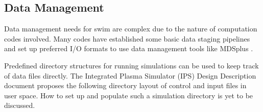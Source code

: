 
\subsection{Data Management}
\label{sec:datamanager}

Data management needs for \ac{swim} are complex due to the nature of
computation codes involved. Many codes have established some basic 
data staging pipelines and set up preferred I/O formats
to use data management tools like MDSplus \cite{mdsplus}. 

Predefined directory structures for running simulations can be used
to keep track of data files directly. The Integrated Plasma Simulator (IPS)
Design Description document proposes the following directory layout of control 
and input files in user space. 
How to set up and populate such a simulation directory is yet to be 
discussed. 
\newpage
